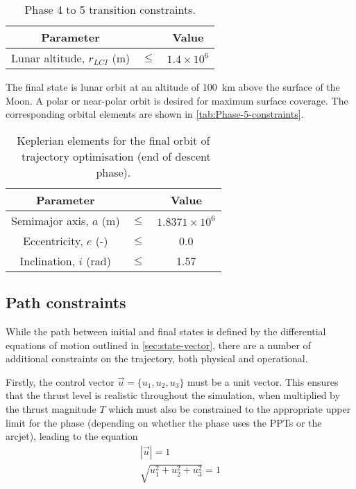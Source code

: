 \begin{table}[ht]
\caption{Phase 4 to 5 transition constraints.} \label{tab:Phase-4-5-constraints}
\centering
\begin{tabular} {ccc}\toprule
Parameter && Value\\\midrule
Lunar altitude, $r_{LCI}$ (m) &$\le$& $1.4\times 10^6$\\\bottomrule
\end{tabular}
\end{table}

The final state is lunar orbit at an altitude of 100~km above the surface of the Moon. A polar or near-polar orbit is desired for maximum surface coverage. The corresponding orbital elements are shown in \autoref{tab:Phase-5-constraints}.

\begin{table}[ht]
\caption{Keplerian elements for the final orbit of \BW\ trajectory optimisation (end of descent phase).} \label{tab:Phase-5-constraints}
\centering
\begin{tabular} {ccc}\toprule
Parameter && Value\\\midrule
Semimajor axis, $a$ (m) &$\le$& $1.8371\times 10^6$\\
Eccentricity, $e$ (-) &$\le$& 0.0\\
Inclination, $i$ (rad) &$\le$& 1.57\\\bottomrule
\end{tabular}
\end{table}

\subsection{Path constraints} \label{sub:Path-constraints}

While the path between initial and final states is defined by the differential equations of motion outlined in \autoref{sec:state-vector}, there are a number of additional constraints on the trajectory, both physical and operational.

Firstly, the control vector $\vec{u}=\{u_1,u_2,u_3\}$ must be a unit vector. This ensures that the thrust level is realistic throughout the simulation, when multiplied by the thrust magnitude $T$ which must also be constrained to the appropriate upper limit for the phase (depending on whether the phase uses the PPTs or the arcjet), leading to the equation
\begin{subequations}
\begin{gather}
|\vec{u}|=1 \\
\sqrt{u_1^2+u_2^2+u_3^2}=1
\end{gather}
\end{subequations}

